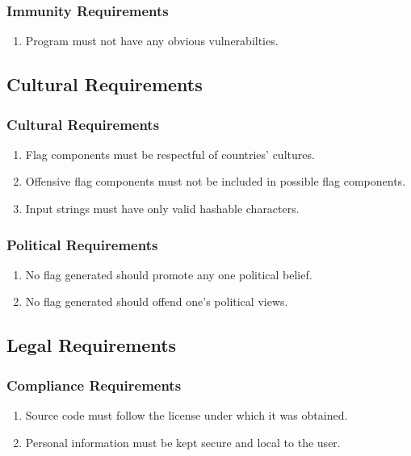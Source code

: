 \documentclass[12pt, titlepage]{article}
\begin{document}
\subsubsection{Immunity Requirements}
\begin{enumerate}[label=SR\arabic*., resume=srs]
    \item Program must not have any obvious vulnerabilties.
\end{enumerate}

\subsection{Cultural Requirements}
\subsubsection{Cultural Requirements}
\begin{enumerate}[label=CP\arabic*., series=cps]
    \item Flag components must be respectful of countries' cultures.
    \item Offensive flag components must not be included in possible flag components.
    \item Input strings must have only valid hashable characters.
\end{enumerate}
\subsubsection{Political Requirements}
\begin{enumerate}[label=CP\arabic*., resume=cps]
    \item No flag generated should promote any one political belief.
    \item No flag generated should offend one's political views.
\end{enumerate}

\subsection{Legal Requirements}
\subsubsection{Compliance Requirements}
\begin{enumerate}[label=LR\arabic*., series=lrs]
    \item Source code must follow the license under which it was obtained.
    \item Personal information must be kept secure and local to the user.
\end{enumerate}
\end{document}
